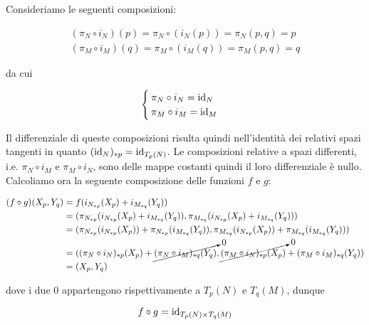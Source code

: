 Consideriamo le seguenti composizioni:

\begin{gather}
	(\pi_{N} \circ i_{N}) (p) = \pi_{N} \circ (i_{N} (p)) = \pi_{N} (p,q) = p\\
	(\pi_{M} \circ i_{M}) (q) = \pi_{M} \circ (i_{M} (q)) = \pi_{M} (p,q) = q
\end{gather}

da cui

\begin{equation}
	\begin{cases}
		\pi_{N} \circ i_{N} = \operatorname{id}_{N}\\
		\pi_{M} \circ i_{M} = \operatorname{id}_{M}
	\end{cases}
\end{equation}

Il differenziale di queste composizioni risulta quindi nell'identità dei relativi spazi tangenti in quanto $ (\operatorname{id}_{N})_{*p} = \operatorname{id}_{T_{p}(N)} $. Le composizioni relative a spazi differenti, i.e. $ \pi_{N} \circ i_{M} $ e $ \pi_{M} \circ i_{N} $, sono delle mappe costanti quindi il loro differenziale è nullo.\\
Calcoliamo ora la seguente composizione delle funzioni $ f $ e $ g $:

\begin{align}
	\begin{split}
		(f \circ g) (X_{p}, Y_{q}) &= f ( i_{N_{*p}} (X_{p}) + i_{M_{*q}} (Y_{q}) )\\
		&= (\pi_{N_{*p}} ( i_{N_{*p}} (X_{p}) + i_{M_{*q}} (Y_{q}) ), \pi_{M_{*q}} ( i_{N_{*p}} (X_{p}) + i_{M_{*q}} (Y_{q}) ))\\
		&= (\pi_{N_{*p}} ( i_{N_{*p}} (X_{p}) ) + \pi_{N_{*p}} ( i_{M_{*q}} (Y_{q}) ), \pi_{M_{*q}} ( i_{N_{*p}} (X_{p})) + \pi_{M_{*q}} ( i_{M_{*q}} (Y_{q}) ))\\
		&= ((\pi_{N} \circ i_{N})_{*p} (X_{p}) + \cancelto{0}{ (\pi_{N} \circ i_{M})_{*q} (Y_{q}) }, \cancelto{0}{ (\pi_{M} \circ i_{N})_{*p} (X_{p}) } + (\pi_{M} \circ i_{M})_{*q} (Y_{q}) )\\
		&=(X_{p}, Y_{q})
	\end{split}
\end{align}

dove i due $ 0 $ appartengono rispettivamente a $ T_{p}(N) $ e $ T_{q}(M) $, dunque

\begin{equation}
	f \circ g = \operatorname{id}_{T_{p}(N) \times T_{q}(M)}
\end{equation}

